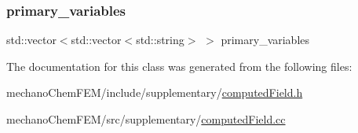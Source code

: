 \subsubsection{\texorpdfstring{primary\_variables}{primary\_variables}}
{\footnotesize\ttfamily std\+::vector$<$std\+::vector$<$std\+::string$>$ $>$ primary\+\_\+variables}



The documentation for this class was generated from the following files\+:\begin{DoxyCompactItemize}
\item 
mechano\+Chem\+F\+E\+M/include/supplementary/\mbox{\hyperlink{computed_field_8h}{computed\+Field.\+h}}\item 
mechano\+Chem\+F\+E\+M/src/supplementary/\mbox{\hyperlink{computed_field_8cc}{computed\+Field.\+cc}}\end{DoxyCompactItemize}
